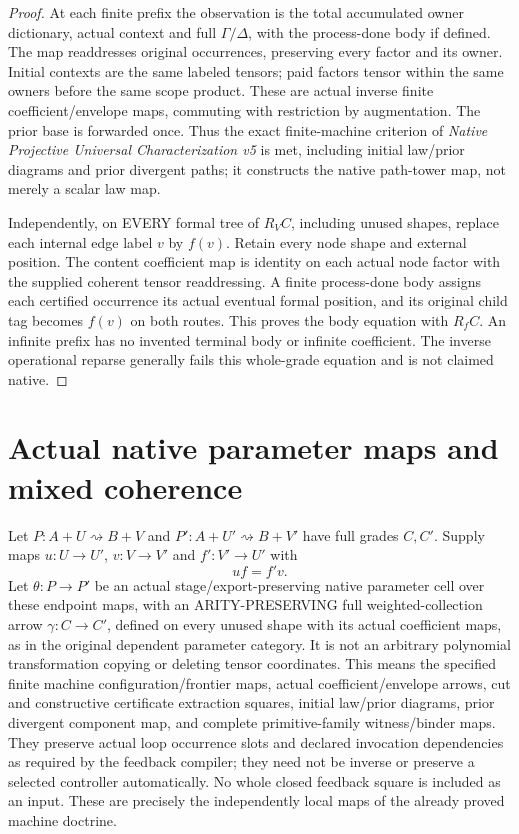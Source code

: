 \documentclass[11pt]{article}
\begin{document}
\begin{proof}
At each finite prefix the observation is the total accumulated owner dictionary, actual context and full $\Gamma/\Delta$, with the process-done body if defined. The map readdresses original occurrences, preserving every factor and its owner. Initial contexts are the same labeled tensors; paid factors tensor within the same owners before the same scope product. These are actual inverse finite coefficient/envelope maps, commuting with restriction by augmentation. The prior base is forwarded once. Thus the exact finite-machine criterion of \emph{Native Projective Universal Characterization v5} is met, including initial law/prior diagrams and prior divergent paths; it constructs the native path-tower map, not merely a scalar law map.

Independently, on EVERY formal tree of $R_VC$, including unused shapes, replace each internal edge label $v$ by $f(v)$. Retain every node shape and external position. The content coefficient map is identity on each actual node factor with the supplied coherent tensor readdressing. A finite process-done body assigns each certified occurrence its actual eventual formal position, and its original child tag becomes $f(v)$ on both routes. This proves the body equation with $R_fC$. An infinite prefix has no invented terminal body or infinite coefficient. The inverse operational reparse generally fails this whole-grade equation and is not claimed native.
\end{proof}

\section{Actual native parameter maps and mixed coherence}
Let $P:A+U\rightsquigarrow B+V$ and $P':A+U'\rightsquigarrow B+V'$ have full grades $C,C'$. Supply maps $u:U\to U'$, $v:V\to V'$ and $f':V'\to U'$ with
\[
                         u f=f'v. \tag{3}
\]
Let $\theta:P\to P'$ be an actual stage/export-preserving native parameter cell over these endpoint maps, with an ARITY-PRESERVING full weighted-collection arrow $\gamma:C\to C'$, defined on every unused shape with its actual coefficient maps, as in the original dependent parameter category. It is not an arbitrary polynomial transformation copying or deleting tensor coordinates. This means the specified finite machine configuration/frontier maps, actual coefficient/envelope arrows, cut and constructive certificate extraction squares, initial law/prior diagrams, prior divergent component map, and complete primitive-family witness/binder maps. They preserve actual loop occurrence slots and declared invocation dependencies as required by the feedback compiler; they need not be inverse or preserve a selected controller automatically. No whole closed feedback square is included as an input. These are precisely the independently local maps of the already proved machine doctrine.
\end{document}
